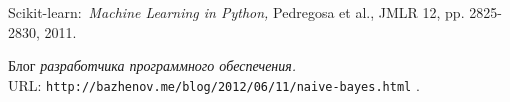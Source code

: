 \begin{thebibliography}{99}
Scikit-learn:\,
{\itshape Machine Learning in Python,} Pedregosa et al., JMLR 12, pp. 2825-2830, 2011.

Блог
{\itshape разработчика программного обеспечения.} \\URL: \texttt{http://bazhenov.me/blog/2012/06/11/naive-bayes.html} .

\end{thebibliography}
\pagebreak
